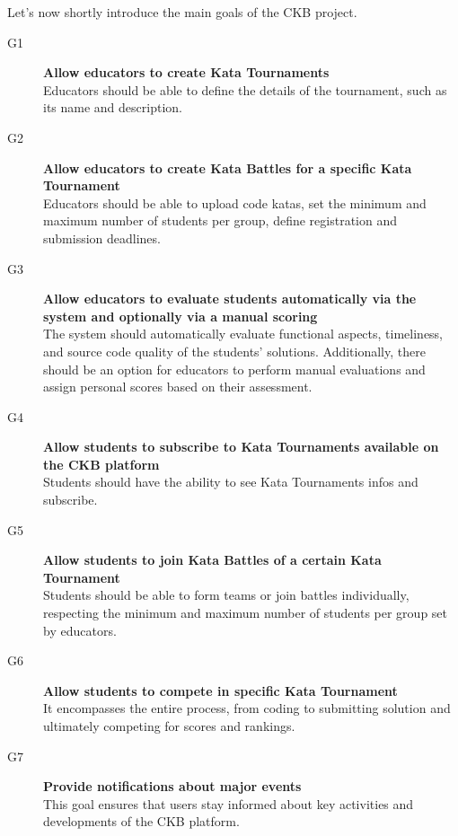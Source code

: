 \documentclass[11pt]{report}
\begin{document}
    Let's now shortly introduce the main goals of the CKB project.
    \begin{description}
        \item[G1] \textbf{Allow educators to create Kata Tournaments}
            \\ 
            Educators should be able to define the details of the tournament, such as its name and description.
        \item[G2] \textbf{Allow educators to create Kata Battles for a specific Kata Tournament}
            \\
            Educators should be able to upload code katas, set the minimum and maximum number of students per group,
            define registration and submission deadlines.
        \item[G3] \textbf{Allow educators to evaluate students automatically via the system and optionally via a manual scoring}
            \\
            The system should automatically evaluate functional aspects, timeliness, and source code quality of the students' solutions.
            Additionally, there should be an option for educators to perform manual evaluations and assign personal scores based
            on their assessment.
        \item[G4] \textbf{Allow students to subscribe to Kata Tournaments available on the CKB platform}
            \\
            Students should have the ability to see Kata Tournaments infos and subscribe.
        \item[G5] \textbf{Allow students to join Kata Battles of a certain Kata Tournament}
            \\
            Students should be able to form teams or join battles individually, respecting the minimum and maximum number
            of students per group set by educators.
        \item[G6] \textbf{Allow students to compete in specific Kata Tournament}
            \\
            It encompasses the entire process, from coding to submitting solution and ultimately competing for scores and rankings.
        \item[G7] \textbf{Provide notifications about major events}
            \\
            This goal ensures that users stay informed about key activities and developments of the CKB platform.
    \end{description}
\end{document}
